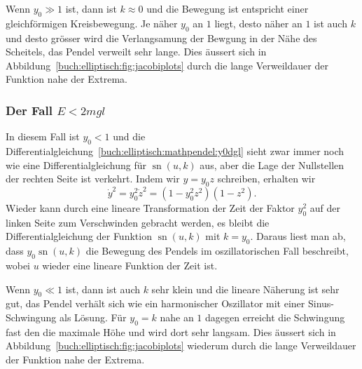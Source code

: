 Wenn $y_0 \gg 1$ ist, dann ist $k\approx 0$ und die Bewegung ist
entspricht einer gleichförmigen Kreisbewegung.
Je näher $y_0$ an $1$ liegt, desto näher an $1$ ist auch $k$ und
desto grösser wird die Verlangsamung der Bewgung in der Nähe des
Scheitels, das Pendel verweilt sehr lange.
Dies äussert sich in Abbildung~\ref{buch:elliptisch:fig:jacobiplots}
durch die lange Verweildauer der Funktion nahe der Extrema.

%
%
\subsubsection{Der Fall $E<2mgl$}
In diesem Fall ist $y_0<1$ und die
Differentialgleichung~\eqref{buch:elliptisch:mathpendel:y0dgl}
sieht zwar immer noch wie eine Differentialgleichung für
$\operatorname{sn}(u,k)$ aus, aber die Lage der Nullstellen
der rechten Seite ist verkehrt.
Indem wir $y=y_0z$ schreiben, erhalten wir 
\begin{equation}
\dot{y}^2
=
y_0^2 \dot{z}^2
=
(1-y_0^2z^2)(1-z^2).
\end{equation}
Wieder kann durch eine lineare Transformation der Zeit der Faktor $y_0^2$
auf der linken Seite zum Verschwinden gebracht werden, es bleibt
die Differentialgleichung der Funktion $\operatorname{sn}(u,k)$
mit $k=y_0$.
Daraus liest man ab, dass $y_0\operatorname{sn}(u,k)$ die Bewegung
des Pendels im oszillatorischen Fall beschreibt, wobei $u$ wieder
eine lineare Funktion der Zeit ist.

Wenn $y_0\ll 1$ ist, dann ist auch $k$ sehr klein und die lineare
Näherung ist sehr gut, das Pendel verhält sich wie ein harmonischer
Oszillator mit einer Sinus-Schwingung als Lösung.
Für $y_0=k$ nahe an $1$ dagegen erreicht die Schwingung fast den
die maximale Höhe und wird dort sehr langsam.
Dies äussert sich in Abbildung~\ref{buch:elliptisch:fig:jacobiplots}
wiederum durch die lange Verweildauer der Funktion nahe der Extrema.


